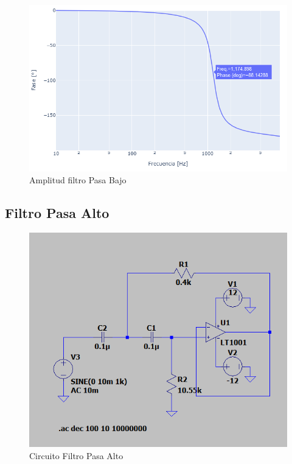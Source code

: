 \begin{figure}[H]
    \centering
    \includegraphics[width=1.0\linewidth]{figuras/diagramas/pasa_bajo_fase.png}
    \caption{Amplitud filtro Pasa Bajo}
\end{figure}

\subsection{Filtro Pasa Alto}

\begin{figure}[H]
    \centering
    \includegraphics[width=1.0\linewidth]{figuras/pasaaltocircuito.png}
    \caption{Circuito Filtro Pasa Alto}
\end{figure}

